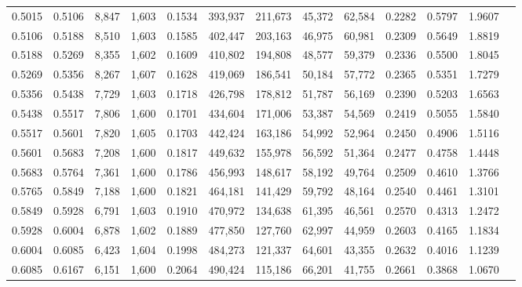 \begin{tabular}{rrrrrrrrrrrrr}
0.5015 & 0.5106 &  8,847 & 1,603 &                                     0.1534 & 393,937 & 211,673 &  45,372 &  62,584 & 0.2282 & 0.5797 & 1.9607 \\
0.5106 & 0.5188 &  8,510 & 1,603 &                                     0.1585 & 402,447 & 203,163 &  46,975 &  60,981 & 0.2309 & 0.5649 & 1.8819 \\
0.5188 & 0.5269 &  8,355 & 1,602 &                                     0.1609 & 410,802 & 194,808 &  48,577 &  59,379 & 0.2336 & 0.5500 & 1.8045 \\
0.5269 & 0.5356 &  8,267 & 1,607 &                                     0.1628 & 419,069 & 186,541 &  50,184 &  57,772 & 0.2365 & 0.5351 & 1.7279 \\
0.5356 & 0.5438 &  7,729 & 1,603 &                                     0.1718 & 426,798 & 178,812 &  51,787 &  56,169 & 0.2390 & 0.5203 & 1.6563 \\
0.5438 & 0.5517 &  7,806 & 1,600 &                                     0.1701 & 434,604 & 171,006 &  53,387 &  54,569 & 0.2419 & 0.5055 & 1.5840 \\
0.5517 & 0.5601 &  7,820 & 1,605 &                                     0.1703 & 442,424 & 163,186 &  54,992 &  52,964 & 0.2450 & 0.4906 & 1.5116 \\
0.5601 & 0.5683 &  7,208 & 1,600 &                                     0.1817 & 449,632 & 155,978 &  56,592 &  51,364 & 0.2477 & 0.4758 & 1.4448 \\
0.5683 & 0.5764 &  7,361 & 1,600 &                                     0.1786 & 456,993 & 148,617 &  58,192 &  49,764 & 0.2509 & 0.4610 & 1.3766 \\
0.5765 & 0.5849 &  7,188 & 1,600 &                                     0.1821 & 464,181 & 141,429 &  59,792 &  48,164 & 0.2540 & 0.4461 & 1.3101 \\
0.5849 & 0.5928 &  6,791 & 1,603 &                                     0.1910 & 470,972 & 134,638 &  61,395 &  46,561 & 0.2570 & 0.4313 & 1.2472 \\
0.5928 & 0.6004 &  6,878 & 1,602 &                                     0.1889 & 477,850 & 127,760 &  62,997 &  44,959 & 0.2603 & 0.4165 & 1.1834 \\
0.6004 & 0.6085 &  6,423 & 1,604 &                                     0.1998 & 484,273 & 121,337 &  64,601 &  43,355 & 0.2632 & 0.4016 & 1.1239 \\
0.6085 & 0.6167 &  6,151 & 1,600 &                                     0.2064 & 490,424 & 115,186 &  66,201 &  41,755 & 0.2661 & 0.3868 & 1.0670 \\

\end{tabular}
